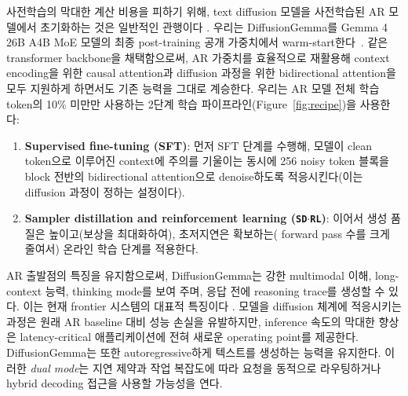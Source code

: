 \documentclass[11pt, a4paper, logo, copyright, gdm]{google}
\newcommand{\sdrl}{\texttt{{\small SD$\cdot$RL}}\xspace}
\begin{document}
사전학습의 막대한 계산 비용을 피하기 위해, text diffusion 모델을 사전학습된 AR 모델에서 초기화하는 것은 일반적인 관행이다 \citep{han2024transfer,Gong2024ar2diff}. 우리는 DiffusionGemma를 Gemma 4 26B A4B MoE 모델의 최종 post-training 공개 가중치에서 warm-start한다~\citep{gemmateam2026gemma4technicalreport}. 같은 transformer backbone을 채택함으로써, AR 가중치를 효율적으로 재활용해 context encoding을 위한 causal attention과 diffusion 과정을 위한 bidirectional attention을 모두 지원하게 하면서도 기존 능력을 그대로 계승한다. 우리는 AR 모델 전체 학습 token의 10\% 미만만 사용하는 2단계 학습 파이프라인(Figure~\ref{fig:recipe})을 사용한다:

\begin{enumerate}[topsep=0pt]
    \item \textbf{Supervised fine-tuning (SFT)}: 먼저 SFT 단계를 수행해, 모델이 clean token으로 이루어진 context에 주의를 기울이는 동시에 256 noisy token 블록을 block 전반의 bidirectional attention으로 denoise하도록 적응시킨다(이는 diffusion 과정이 정하는 설정이다).
    \item \textbf{Sampler distillation and reinforcement learning (\sdrl)}: 이어서 생성 품질은 높이고(보상을 최대화하여), 초저지연은 확보하는( forward pass 수를 크게 줄여서) 온라인 학습 단계를 적용한다.
\end{enumerate}

AR 출발점의 특징을 유지함으로써, DiffusionGemma는 강한 multimodal 이해, long-context 능력, thinking mode를 보여 주며, 응답 전에 reasoning trace를 생성할 수 있다. 이는 현재 frontier 시스템의 대표적 특징이다 \citep{geminiteam2025gemini}. 모델을 diffusion 체계에 적응시키는 과정은 원래 AR baseline 대비 성능 손실을 유발하지만, inference 속도의 막대한 향상은 latency-critical 애플리케이션에 전혀 새로운 operating point를 제공한다. DiffusionGemma는 또한 autoregressive하게 텍스트를 생성하는 능력을 유지한다. 이러한 \textit{dual mode}는 지연 제약과 작업 복잡도에 따라 요청을 동적으로 라우팅하거나 hybrid decoding 접근을 사용할 가능성을 연다.
\end{document}
